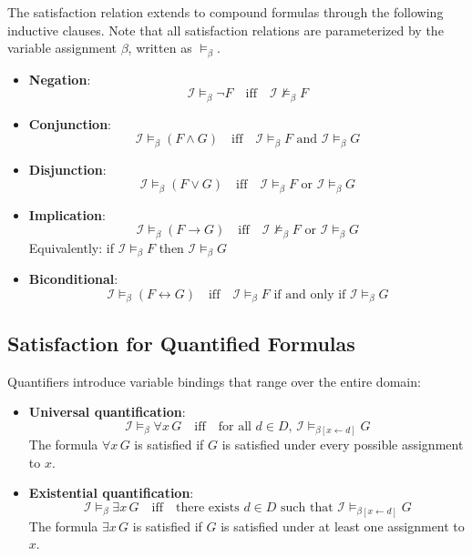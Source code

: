 \documentclass[11pt,a4paper]{article}
\theoremstyle{definition}
\theoremstyle{plain}
\theoremstyle{remark}
\begin{document}
The satisfaction relation extends to compound formulas through the following inductive clauses. Note that all satisfaction relations are parameterized by the variable assignment $\beta$, written as $\models_\beta$.

\begin{itemize}
    \item \textbf{Negation}: 
    \[
    \mathcal{I} \models_\beta \neg F \quad \text{iff} \quad \mathcal{I} \not\models_\beta F
    \]
    
    \item \textbf{Conjunction}: 
    \[
    \mathcal{I} \models_\beta (F \wedge G) \quad \text{iff} \quad \mathcal{I} \models_\beta F \text{ and } \mathcal{I} \models_\beta G
    \]
    
    \item \textbf{Disjunction}: 
    \[
    \mathcal{I} \models_\beta (F \vee G) \quad \text{iff} \quad \mathcal{I} \models_\beta F \text{ or } \mathcal{I} \models_\beta G
    \]
    
    \item \textbf{Implication}: 
    \[
    \mathcal{I} \models_\beta (F \rightarrow G) \quad \text{iff} \quad \mathcal{I} \not\models_\beta F \text{ or } \mathcal{I} \models_\beta G
    \]
    Equivalently: if $\mathcal{I} \models_\beta F$ then $\mathcal{I} \models_\beta G$
    
    \item \textbf{Biconditional}: 
    \[
    \mathcal{I} \models_\beta (F \leftrightarrow G) \quad \text{iff} \quad \mathcal{I} \models_\beta F \text{ if and only if } \mathcal{I} \models_\beta G
    \]
\end{itemize}

\subsection{Satisfaction for Quantified Formulas}

Quantifiers introduce variable bindings that range over the entire domain:

\begin{itemize}
    \item \textbf{Universal quantification}: 
    \[
    \mathcal{I} \models_\beta \forall x \, G \quad \text{iff} \quad \text{for all } d \in D, \, \mathcal{I} \models_{\beta[x \leftarrow d]} G
    \]
    The formula $\forall x \, G$ is satisfied if $G$ is satisfied under every possible assignment to $x$.
    
    \item \textbf{Existential quantification}: 
    \[
    \mathcal{I} \models_\beta \exists x \, G \quad \text{iff} \quad \text{there exists } d \in D \text{ such that } \mathcal{I} \models_{\beta[x \leftarrow d]} G
    \]
    The formula $\exists x \, G$ is satisfied if $G$ is satisfied under at least one assignment to $x$.
\end{itemize}
\end{document}

